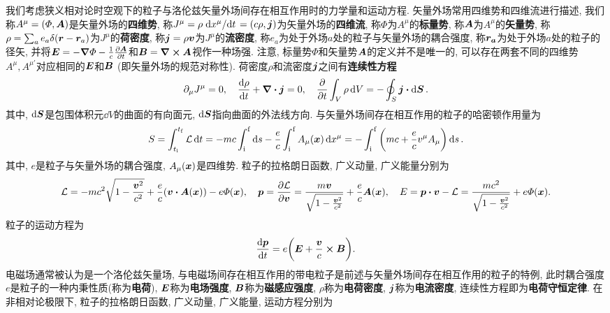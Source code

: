 我们考虑狭义相对论时空观下的粒子与洛伦兹矢量外场间存在相互作用时的力学量和运动方程. 矢量外场常用四维势和四维流进行描述, 我们称$ A^{\mu}=(\varPhi,\vb*{A}) $是矢量外场的\textbf{四维势}, 称$ J^{\mu} = \rho \dv*{x^{\mu}}{t} =(c\rho,\vb*{j}) $为矢量外场的\textbf{四维流}, 称$ \varPhi $为$ A^{\mu} $的\textbf{标量势}, 称$ \vb*{A} $为$ A^{\mu} $的\textbf{矢量势}, 称$ \rho=\sum_a e_a \delta{(\vb*{r}-\vb*{r}_a)} $为$ J^{\mu} $的\textbf{荷密度}, 称$ \vb*{j} = \rho \vb*{v} $为$ J^{\mu} $的\textbf{流密度}, 称$ e_a $为处于外场$ a $处的粒子与矢量外场的耦合强度, 称$ \vb*{r_a} $为处于外场$ a $处的粒子的径矢, 并将$ \vb*{E} = -\grad{\varPhi}-\frac{1}{c}\pdv{\vb*{A}}{t} $和$ \vb*{B} = \curl{\vb*{A}} $视作一种场强. 注意, 标量势$ \varPhi $和矢量势$ \vb*{A} $的定义并不是唯一的, 可以存在两套不同的四维势$ A^{\mu},A^{\mu\prime} $对应相同的$ \vb*{E} $和$ \vb*{B} $ (即矢量外场的规范对称性). 荷密度$ \rho $和流密度$ \vb*{j} $之间有\textbf{连续性方程}
\begin{equation}
    \partial_{\mu} J^{\mu} = 0, \quad \dv{\rho}{t} + \div{\vb*{j}}=0, \quad \pdv{t} \int_V \rho \dd{V} = - \oint_S \vb*{j} \vdot \dd{\vb*{S}}.
\end{equation}
其中, $ \dd{\vb*{S}} $是包围体积元$ \dd{V} $的曲面的有向面元, $ \dd{\vb*{S}} $指向曲面的外法线方向. 与矢量外场间存在相互作用的粒子的哈密顿作用量为
\begin{equation*}
    S = \int_{t_{\mathrm{i}}}^{t_{\mathrm{f}}} \mathcal{L} \dd{t} = -mc \int_{\mathrm{i}}^{\mathrm{f}} \dd{s} - \frac{e}{c} \int_{\mathrm{i}}^{\mathrm{f}} A_{\mu} (\vb*{x}) \dd{x^{\mu}} = - \int_{\mathrm{i}}^{\mathrm{f}} \bigg(mc + \frac{e}{c} v^{\mu} A_{\mu}\bigg) \dd{s}.
\end{equation*}
其中, $ e $是粒子与矢量外场的耦合强度, $ A_{\mu} (\vb*{x}) $是四维势. 粒子的拉格朗日函数, 广义动量, 广义能量分别为
\begin{equation*}
    \lagr = -mc^2 \sqrt{1-\frac{\vb*{v}^2}{c^2}} + \frac{e}{c} (\vb*{v} \vdot \vb*{A}(\vb*{x})) - e \varPhi(\vb*{x}), \quad \vb*{p} = \pdv{\lagr}{\vb*{v}} = \frac{m\vb*{v}}{\sqrt{1-\frac{\vb*{v}^2}{c^2}}} + \frac{e}{c} \vb*{A}(\vb*{x}), \quad E = \vb*{p} \vdot \vb*{v} - \lagr = \frac{mc^2}{\sqrt{1-\frac{\vb*{v}^2}{c^2}}} + e \varPhi(\vb*{x}).
\end{equation*}
粒子的运动方程为
\begin{equation}
    \dv{\vb*{p}}{t} = e \bigg( \vb*{E} + \frac{\vb*{v}}{c} \cross \vb*{B} \bigg).
\end{equation}
电磁场通常被认为是一个洛伦兹矢量场, 与电磁场间存在相互作用的带电粒子是前述与矢量外场间存在相互作用的粒子的特例, 此时耦合强度$ e $是粒子的一种内秉性质(称为\textbf{电荷}), $ \vb*{E} $称为\textbf{电场强度}, $ \vb*{B} $称为\textbf{磁感应强度}, $ \rho $称为\textbf{电荷密度}, $ \vb*{j} $称为\textbf{电流密度}, 连续性方程即为\textbf{电荷守恒定律}. 在非相对论极限下, 粒子的拉格朗日函数, 广义动量, 广义能量, 运动方程分别为
